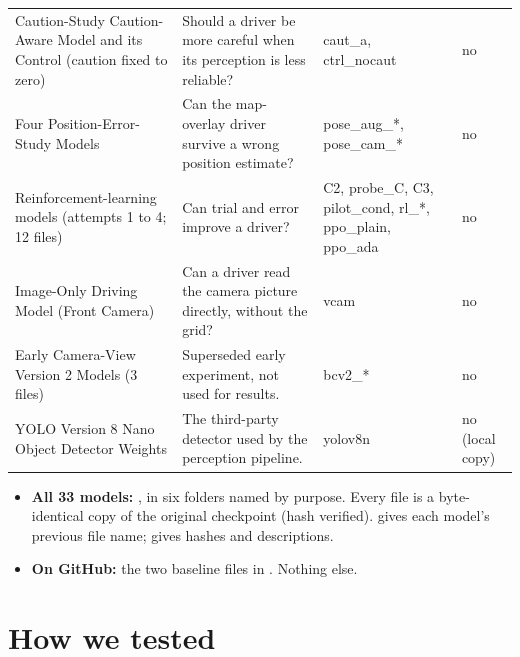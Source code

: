 {\begin{longtable}{@{}>{\raggedright\arraybackslash}p{4.6cm}>{\raggedright\arraybackslash}p{6.6cm}>{\raggedright\arraybackslash}p{2.2cm}>{\raggedright\arraybackslash}p{1.6cm}@{}}
Caution-Study Caution-Aware Model and its Control (caution fixed to zero) & Should a driver be more careful when its perception is less reliable? & caut\_a, ctrl\_nocaut & no\\
Four Position-Error-Study Models & Can the map-overlay driver survive a wrong position estimate? & pose\_aug\_*, pose\_cam\_* & no\\
Reinforcement-learning models (attempts 1 to 4; 12 files) & Can trial and error improve a driver? & C2, probe\_C, C3, pilot\_cond, rl\_*, ppo\_plain, ppo\_ada & no\\
Image-Only Driving Model (Front Camera) & Can a driver read the camera picture directly, without the grid? & vcam & no\\
Early Camera-View Version 2 Models (3 files) & Superseded early experiment, not used for results. & bcv2\_* & no\\
YOLO Version 8 Nano Object Detector Weights & The third-party detector used by the perception pipeline. & yolov8n & no (local copy)\\
\end{longtable}
}

\begin{cautionbox}
\begin{itemize}[leftmargin=1.2em,itemsep=1pt]
\item \textbf{All 33 models:} , in six folders named by purpose. Every file is a byte-identical copy of the original checkpoint (hash verified).  gives each model's previous file name;  gives hashes and descriptions.
\item \textbf{On GitHub:} the two baseline files in . Nothing else.
\end{itemize}
\end{cautionbox}

\section{How we tested}

